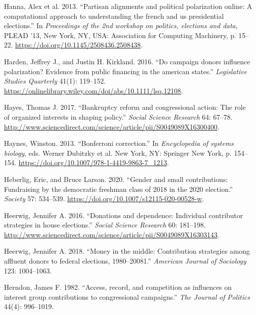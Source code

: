 \documentclass[12pt,]{article}
\begin{document}
\leavevmode\hypertarget{ref-hanna2013}{}%
Hanna, Alex et al. 2013. ``Partisan alignments and political
polarization online: A computational approach to understanding the
french and us presidential elections.'' In \emph{Proceedings of the 2nd
workshop on politics, elections and data}, PLEAD '13, New York, NY, USA:
Association for Computing Machinery, p. 15--22.
\url{https://doi.org/10.1145/2508436.2508438}.

\leavevmode\hypertarget{ref-harden2016}{}%
Harden, Jeffrey J., and Justin H. Kirkland. 2016. ``Do campaign donors
influence polarization? Evidence from public financing in the american
states.'' \emph{Legislative Studies Quarterly} 41(1): 119--152.
\url{https://onlinelibrary.wiley.com/doi/abs/10.1111/lsq.12108}.

\leavevmode\hypertarget{ref-hayes2017}{}%
Hayes, Thomas J. 2017. ``Bankruptcy reform and congressional action: The
role of organized interests in shaping policy.'' \emph{Social Science
Research} 64: 67--78.
\url{http://www.sciencedirect.com/science/article/pii/S0049089X16300400}.

\leavevmode\hypertarget{ref-bonferroni}{}%
Haynes, Winston. 2013. ``Bonferroni correction.'' In \emph{Encyclopedia
of systems biology}, eds. Werner Dubitzky et al. New York, NY: Springer
New York, p. 154--154.
\url{https://doi.org/10.1007/978-1-4419-9863-7_1213}.

\leavevmode\hypertarget{ref-heberlig2020}{}%
Heberlig, Eric, and Bruce Larson. 2020. ``Gender and small
contributions: Fundraising by the democratic freshman class of 2018 in
the 2020 election.'' \emph{Society} 57: 534--539.
\url{https://doi.org/10.1007/s12115-020-00528-w}.

\leavevmode\hypertarget{ref-heerwig2016}{}%
Heerwig, Jennifer A. 2016. ``Donations and dependence: Individual
contributor strategies in house elections.'' \emph{Social Science
Research} 60: 181--198.
\url{http://www.sciencedirect.com/science/article/pii/S0049089X16303143}.

\leavevmode\hypertarget{ref-heerwig2018}{}%
Heerwig, Jennifer A. 2018. ``Money in the middle: Contribution
strategies among affluent donors to federal elections, 1980--20081.''
\emph{American Journal of Sociology} 123: 1004--1063.

\leavevmode\hypertarget{ref-herndon1982}{}%
Herndon, James F. 1982. ``Access, record, and competition as influences
on interest group contributions to congressional campaigns.'' \emph{The
Journal of Politics} 44(4): 996--1019.
\end{document}
